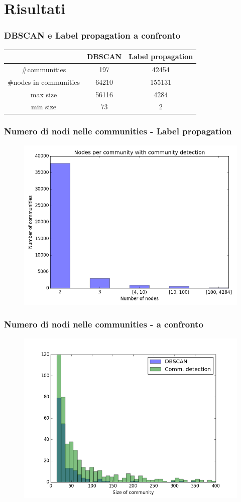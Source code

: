 \documentclass{beamer}
\begin{document}
\section{Risultati}
\frame{\sectionpage}
\begin{frame}
 \frametitle{DBSCAN e Label propagation a confronto}
 \begin{center}
  \begin{tabular}{||c|c|c||}
\hline
 & DBSCAN & Label propagation \\ 
\hline
#communities & 197 & 42454 \\
\hline
#nodes in communities & 64210 & 155131 \\
\hline
max size & 56116 & 4284 \\
\hline
min size & 73 & 2 \\
\hline
\end{tabular}
\end{center}
\end{frame}
\begin{frame}
 \frametitle{Numero di nodi nelle communities - Label propagation}
 
  \begin{figure}[htbp]
\centering
\includegraphics[height=6.0 cm,width=10 cm]{plot_net_nnodes.png}

\end{figure}
\end{frame}
\begin{frame}
 \frametitle{Numero di nodi nelle communities - a confronto}
 
  \begin{figure}[htbp]
\centering
\includegraphics[height=6.0 cm,width=10 cm]{plot_nnodes.png}

\end{figure}
\end{frame}
\end{document}
